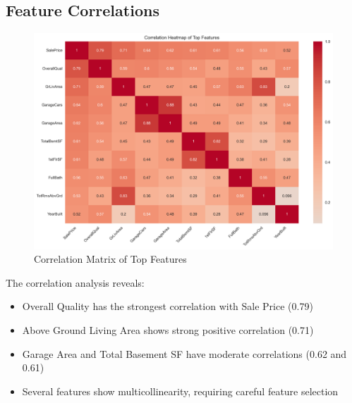 \subsection{Feature Correlations}
\begin{figure}[H]
    \centering
    \includegraphics[width=1.0\textwidth]{figures/correlation_matrix.png}
    \caption{Correlation Matrix of Top Features}
    \label{fig:correlation_matrix}
\end{figure}

The correlation analysis reveals:
\begin{itemize}
    \item Overall Quality has the strongest correlation with Sale Price (0.79)
    \item Above Ground Living Area shows strong positive correlation (0.71)
    \item Garage Area and Total Basement SF have moderate correlations (0.62 and 0.61)
    \item Several features show multicollinearity, requiring careful feature selection
\end{itemize}

